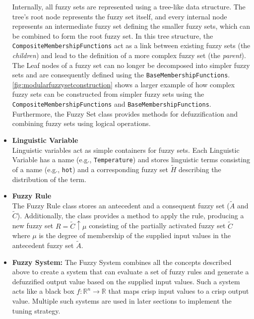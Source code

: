 \begin{itemize}
        \smallskip
        Internally, all fuzzy sets are represented using a tree-like data structure. The tree's root node represents the fuzzy set itself, and every internal node represents an intermediate fuzzy set defining the smaller fuzzy sets, which can be combined to form the root fuzzy set. In this tree structure, the \texttt{CompositeMembershipFunctions} act as a link between existing fuzzy sets (the \emph{children}) and lead to the definition of a more complex fuzzy set (the \emph{parent}). The Leaf nodes of a fuzzy set can no longer be decomposed into simpler fuzzy sets and are consequently defined using the \texttt{BaseMembershipFunctions}.
        \autoref{fig:modularfuzzysetconstruction} shows a larger example of how complex fuzzy sets can be constructed from simpler fuzzy sets using the \texttt{CompositeMembershipFunctions} and \texttt{BaseMembershipFunctions}. \\
        Furthermore, the Fuzzy Set class provides methods for defuzzification and combining fuzzy sets using logical operations.

  \item \textbf{Linguistic Variable}\\
        Linguistic variables act as simple containers for fuzzy sets. Each Linguistic Variable has a name (e.g., \texttt{Temperature}) and stores linguistic terms consisting of a name (e.g., \texttt{hot}) and a corresponding fuzzy set $\tilde{H}$ describing the distribution of the term.

  \item \textbf{Fuzzy Rule}\\
        The Fuzzy Rule class stores an antecedent and a consequent fuzzy set ($\tilde{A}$ and $\tilde{C}$). Additionally, the class provides a method to apply the rule, producing a new fuzzy set $R=\tilde{C}\uparrow \mu$ consisting of the partially activated fuzzy set $\tilde{C}$ where $\mu$ is the degree of membership of the supplied input values in the antecedent fuzzy set $\tilde{A}$.

  \item \textbf{Fuzzy System:} The Fuzzy System combines all the concepts described above to create a system that can evaluate a set of fuzzy rules and generate a defuzzified output value based on the supplied input values. Such a system acts like a black box $f: \mathbb{R}^n \rightarrow \mathbb{R}$ that maps crisp input values to a crisp output value. Multiple such systems are used in later sections to implement the tuning strategy.
\end{itemize}

